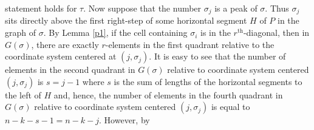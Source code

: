 \documentclass[
final,nomarks
]{dmtcs-episciences}
\begin{document}
statement holds for \begin{math}\tau\end{math}.  Now suppose that the number \begin{math}\sigma_j\end{math} is 
a peak of \begin{math}\sigma\end{math}.  Thus \begin{math}\sigma_j\end{math} sits directly above the first right-step of 
some horizontal segment \begin{math}H\end{math} of \begin{math}P\end{math} in the graph of \begin{math}\sigma\end{math}. By Lemma \ref{p1}, if the cell 
containing \begin{math}\sigma_i\end{math} is in the \begin{math}r^{\mathrm{th}}\end{math}-diagonal, then in \begin{math}G(\sigma)\end{math}, 
there are exactly \begin{math}r\end{math}-elements in the first quadrant relative to the coordinate 
system centered at \begin{math}(j,\sigma_j)\end{math}. It is easy to see that 
the number of elements in the second quadrant in \begin{math}G(\sigma)\end{math} 
relative to coordinate system centered \begin{math}(j,\sigma_j)\end{math} is \begin{math}s=j-1\end{math} where 
\begin{math}s\end{math} is the sum of lengths of the horizontal 
segments to the left of \begin{math}H\end{math} and, hence, the number of elements in the fourth quadrant in \begin{math}G(\sigma)\end{math} 
relative to coordinate system centered \begin{math}(j,\sigma_j)\end{math} is equal to \begin{math}n-k-s-1=n-k-j\end{math}. However, by 
\end{document}
